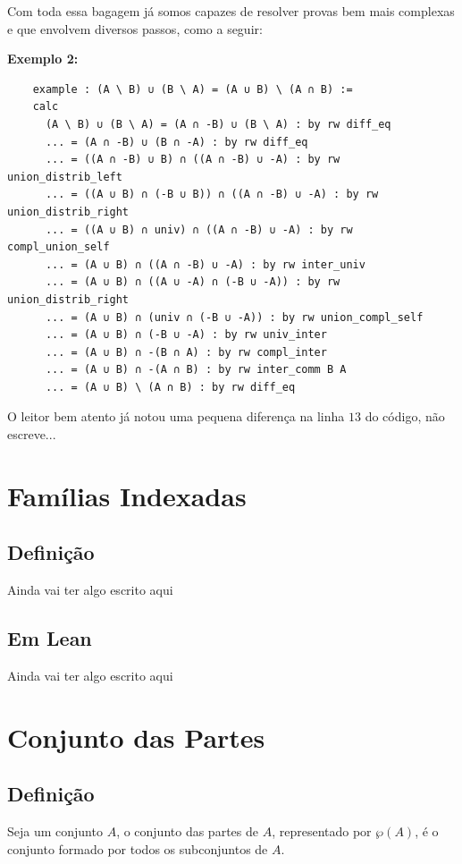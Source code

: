   Com toda essa bagagem já somos capazes de resolver provas bem mais complexas e que envolvem diversos passos, como a seguir:

  \textbf{Exemplo 2:}
  \begin{lstlisting}
    example : (A \ B) ∪ (B \ A) = (A ∪ B) \ (A ∩ B) :=
    calc
      (A \ B) ∪ (B \ A) = (A ∩ -B) ∪ (B \ A) : by rw diff_eq
      ... = (A ∩ -B) ∪ (B ∩ -A) : by rw diff_eq
      ... = ((A ∩ -B) ∪ B) ∩ ((A ∩ -B) ∪ -A) : by rw union_distrib_left
      ... = ((A ∪ B) ∩ (-B ∪ B)) ∩ ((A ∩ -B) ∪ -A) : by rw union_distrib_right
      ... = ((A ∪ B) ∩ univ) ∩ ((A ∩ -B) ∪ -A) : by rw compl_union_self
      ... = (A ∪ B) ∩ ((A ∩ -B) ∪ -A) : by rw inter_univ
      ... = (A ∪ B) ∩ ((A ∪ -A) ∩ (-B ∪ -A)) : by rw union_distrib_right
      ... = (A ∪ B) ∩ (univ ∩ (-B ∪ -A)) : by rw union_compl_self
      ... = (A ∪ B) ∩ (-B ∪ -A) : by rw univ_inter
      ... = (A ∪ B) ∩ -(B ∩ A) : by rw compl_inter
      ... = (A ∪ B) ∩ -(A ∩ B) : by rw inter_comm B A
      ... = (A ∪ B) \ (A ∩ B) : by rw diff_eq \end{lstlisting}

  O leitor bem atento já notou uma pequena diferença na linha $13$ do código, não escreve...

\section{Famílias Indexadas}

  \subsection{Definição}
  Ainda vai ter algo escrito aqui

  \subsection{Em Lean}
  Ainda vai ter algo escrito aqui

\section{Conjunto das Partes}

\subsection{Definição}
Seja um conjunto $A$, o conjunto das partes de $A$, representado por $\wp(A)$, é o conjunto formado por todos os subconjuntos de $A$.

